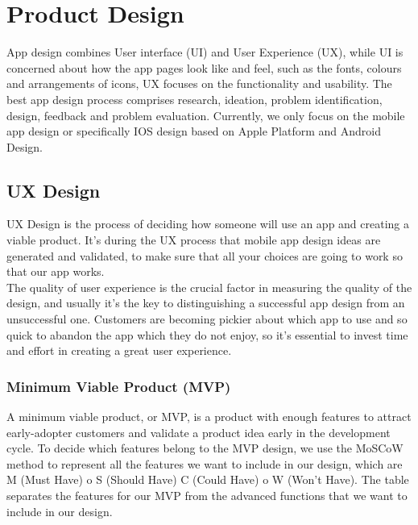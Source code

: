 
\chapter{Product Design} %

\label{Chapter2} %

App design combines User interface (UI) and User Experience (UX), while UI is concerned about how the app pages look like and feel, such as the fonts, colours and arrangements of icons, UX focuses on the functionality and usability. The best app design process comprises research, 
ideation, problem identification, design, feedback and problem evaluation. Currently, we only focus on the mobile app design or specifically IOS design based on Apple Platform and Android Design. 
\section{UX Design}
UX Design is the process of deciding how someone will use an app and creating a viable product. It’s during the UX process that mobile app design ideas are generated and validated, to make sure that all your choices are going to work so that our app works. 
\\The quality of user experience is the crucial factor in measuring the quality of the design, and usually it's the key to distinguishing a successful app design from an unsuccessful one. 
Customers are becoming pickier about which app to use and so quick to abandon the app which they do not enjoy, so it's essential to invest time and effort in creating a great user experience.
\subsection{Minimum Viable Product (MVP)}
A minimum viable product, or MVP,  is a product with enough features to attract early-adopter customers and validate a product idea early in the development cycle. To decide which features belong to the MVP design, we use the MoSCoW method to represent all the features we want to include in our design, which are M (Must Have) o S (Should Have) C (Could Have) o W (Won’t Have). 
The table separates the features for our MVP from the advanced functions that we want to include in our design.

